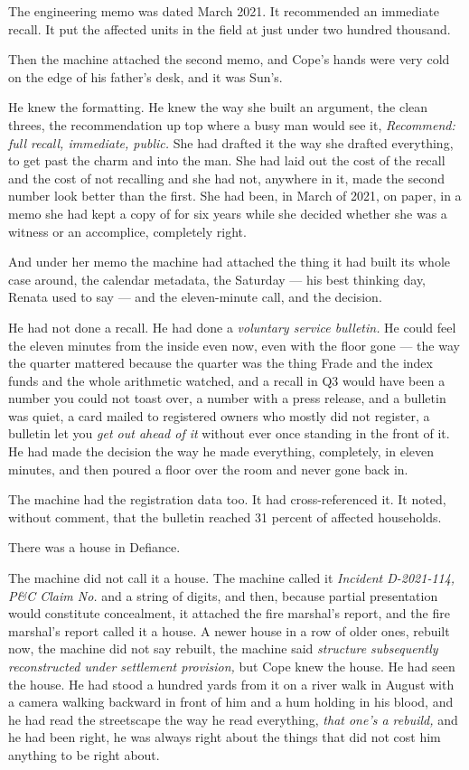 \documentclass[11pt,openany]{book}
\newcommand{\scenebreak}{\par\vspace{0.5\baselineskip}\begin{center}\textasteriskcentered\quad\textasteriskcentered\quad\textasteriskcentered\end{center}\vspace{0.5\baselineskip}\par}
\begin{document}
The engineering memo was dated March 2021. It recommended an immediate recall. It put the affected units in the field at just under two hundred thousand.

Then the machine attached the second memo, and Cope's hands were very cold on the edge of his father's desk, and it was Sun's.

He knew the formatting. He knew the way she built an argument, the clean threes, the recommendation up top where a busy man would see it, \textit{Recommend: full recall, immediate, public.} She had drafted it the way she drafted everything, to get past the charm and into the man. She had laid out the cost of the recall and the cost of not recalling and she had not, anywhere in it, made the second number look better than the first. She had been, in March of 2021, on paper, in a memo she had kept a copy of for six years while she decided whether she was a witness or an accomplice, completely right.

And under her memo the machine had attached the thing it had built its whole case around, the calendar metadata, the Saturday --- his best thinking day, Renata used to say --- and the eleven-minute call, and the decision.

He had not done a recall. He had done a \textit{voluntary service bulletin.} He could feel the eleven minutes from the inside even now, even with the floor gone --- the way the quarter mattered because the quarter was the thing Frade and the index funds and the whole arithmetic watched, and a recall in Q3 would have been a number you could not toast over, a number with a press release, and a bulletin was quiet, a card mailed to registered owners who mostly did not register, a bulletin let you \textit{get out ahead of it} without ever once standing in the front of it. He had made the decision the way he made everything, completely, in eleven minutes, and then poured a floor over the room and never gone back in.

The machine had the registration data too. It had cross-referenced it. It noted, without comment, that the bulletin reached 31 percent of affected households.


\scenebreak


There was a house in Defiance.

The machine did not call it a house. The machine called it \textit{Incident D-2021-114, P\&C Claim No.} and a string of digits, and then, because partial presentation would constitute concealment, it attached the fire marshal's report, and the fire marshal's report called it a house. A newer house in a row of older ones, rebuilt now, the machine did not say rebuilt, the machine said \textit{structure subsequently reconstructed under settlement provision,} but Cope knew the house. He had seen the house. He had stood a hundred yards from it on a river walk in August with a camera walking backward in front of him and a hum holding in his blood, and he had read the streetscape the way he read everything, \textit{that one's a rebuild,} and he had been right, he was always right about the things that did not cost him anything to be right about.
\end{document}
